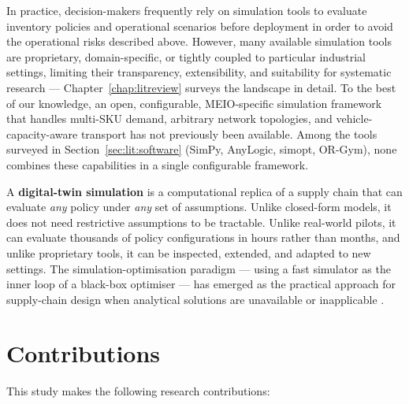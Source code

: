 In practice, decision-makers frequently rely on simulation tools to evaluate
inventory policies and operational scenarios before deployment in order to
avoid the operational risks described above.  However, many available
simulation tools are proprietary, domain-specific, or tightly coupled to
particular industrial settings, limiting their transparency, extensibility,
and suitability for systematic research --- Chapter~\ref{chap:litreview} surveys
the landscape in detail.  To the best of our knowledge, an open, configurable,
MEIO-specific simulation framework that handles multi-SKU demand, arbitrary
network topologies, and vehicle-capacity-aware transport has not previously
been available.  Among the tools surveyed in
Section~\ref{sec:lit:software} (SimPy, AnyLogic, simopt, OR-Gym), none
combines these capabilities in a single configurable framework.

A \textbf{digital-twin simulation} is a computational replica of a supply
chain that can evaluate \emph{any} policy under \emph{any} set of
assumptions.  Unlike closed-form models, it does not need restrictive
assumptions to be tractable.  Unlike real-world pilots, it can evaluate
thousands of policy configurations in hours rather than months, and unlike
proprietary tools, it can be inspected, extended, and adapted to new settings.
The simulation-optimisation paradigm — using a fast simulator as the inner
loop of a black-box optimiser — has emerged as the practical approach for
supply-chain design when analytical solutions are unavailable or
inapplicable \citep{FuEtAl2005}.

\section{Contributions}
\label{sec:intro:contributions}

This study makes the following research contributions:

